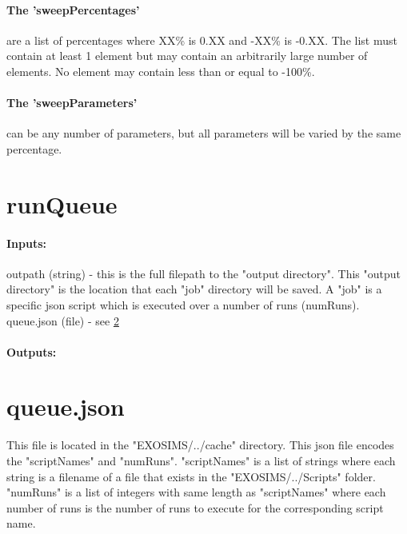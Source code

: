 \documentclass[12pt]{article}
\begin{document}
\paragraph{The 'sweepPercentages'} are a list of percentages   where XX\% is 0.XX and -XX\% is -0.XX. 
The list must contain at least 1 element but may contain an arbitrarily large number of elements.
No element may contain less than or equal to -100\%.
\paragraph{The 'sweepParameters'} can be any number of parameters, but all parameters will be varied by the same percentage.



\section{runQueue}
\paragraph{Inputs:}
outpath (string) - this is the full filepath to the "output directory". This "output directory" is the location that each "job" directory will be saved. A "job" is a specific json script which is executed over a number of runs (numRuns).
queue.json (file) - see \ref{sec:queue.json}
\paragraph{Outputs:}


\section{queue.json}\label{sec:queue.json}
This file is located in the "EXOSIMS/../cache" directory.
This json file encodes the "scriptNames" and "numRuns".
"scriptNames" is a list of strings where each string is a filename of a file that exists in the "EXOSIMS/../Scripts" folder.
"numRuns" is a list of integers with same length as "scriptNames" where each number of runs is the number of runs to execute for the corresponding script name.

\nocite{*}

%
%
%
\end{document}
